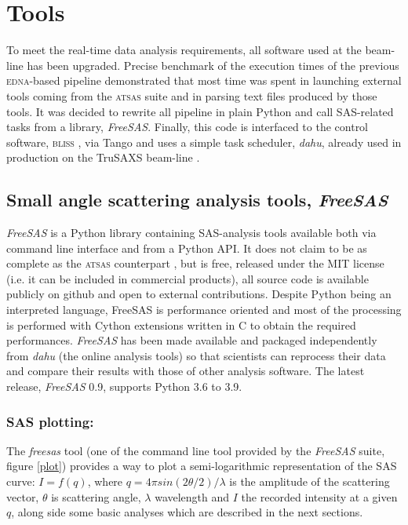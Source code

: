\documentclass[preprint]{iucr}              %
\begin{document}
\section{Tools}

To meet the real-time data analysis requirements, all software used at the beam-line has been upgraded.
Precise benchmark of the execution times of the previous \textsc{edna}-based pipeline demonstrated that 
most time was spent in launching external tools coming from the \textsc{atsas} suite and in parsing text files produced by those tools.
It was decided to rewrite all pipeline in plain Python \cite{python} and call SAS-related tasks from a library, \textit{FreeSAS}. 
Finally, this code is interfaced to the control software, \textsc{bliss} \cite{bliss}, via Tango \cite{tango} and uses a simple task scheduler, \textit{dahu}, already used in production on the TruSAXS beam-line \cite{id02_2022}.

\subsection{Small angle scattering analysis tools, \textit{FreeSAS}}

\textit{FreeSAS} is a Python library containing SAS-analysis tools available both via command line interface and from a Python API. 
It does not claim to be as complete as the \textsc{atsas} counterpart \cite{ATSAS3},
but is free, released under the MIT license (i.e. it can be included in commercial products), all source code is available publicly on github \cite{freesas} and
open to external contributions.
Despite Python being an interpreted language, FreeSAS is performance oriented and most of the processing is performed with Cython \cite{cython} extensions written in C to obtain the required performances. 
\textit{FreeSAS} has been made available and packaged independently from \textit{dahu} (the online analysis tools) so that scientists can reprocess their data and compare their results with those of other analysis software. 
The latest release, \textit{FreeSAS} 0.9, supports Python 3.6 to 3.9.

\subsubsection{SAS plotting:} The \textit{freesas} tool (one of the command line tool provided by the \textit{FreeSAS} suite, figure \ref{plot}) provides a way to plot  a semi-logarithmic representation of the SAS curve: $I=f(q)$, where $q = 4\pi sin(2\theta/2)/\lambda$ is the amplitude of the scattering vector, $\theta$ is scattering angle, $\lambda$ wavelength and $I$ the recorded intensity at a given $q$, along side some basic analyses which are described in the next sections.
\end{document}
